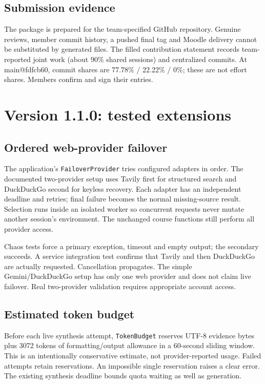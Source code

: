 \documentclass[11pt,a4paper]{article}
\begin{document}
\subsection{Submission evidence}
The package is prepared for the team-specified GitHub repository. Genuine reviews, member commit history, a pushed final tag and Moodle delivery cannot be substituted by generated files. The filled contribution statement records team-reported joint work (about 90\% shared sessions) and centralized commits. At main@fdfcb60, commit shares are 77.78\% / 22.22\% / 0\%; these are not effort shares. Members confirm and sign their entries.


\clearpage
\section*{Version 1.1.0: tested extensions}
\subsection*{Ordered web-provider failover}
The application's \texttt{FailoverProvider} tries configured adapters in order. The documented two-provider setup uses Tavily first for structured search and DuckDuckGo second for keyless recovery. Each adapter has an independent deadline and retries; final failure becomes the normal missing-source result. Selection runs inside an isolated worker so concurrent requests never mutate another session's environment. The unchanged course functions still perform all provider access.

Chaos tests force a primary exception, timeout and empty output; the secondary succeeds. A service integration test confirms that Tavily and then DuckDuckGo are actually requested. Cancellation propagates. The simple Gemini/DuckDuckGo setup has only one web provider and does not claim live failover. Real two-provider validation requires appropriate account access.

\subsection*{Estimated token budget}
Before each live synthesis attempt, \texttt{TokenBudget} reserves UTF-8 evidence bytes plus 3072 tokens of formatting/output allowance in a 60-second sliding window. This is an intentionally conservative estimate, not provider-reported usage. Failed attempts retain reservations. An impossible single reservation raises a clear error. The existing synthesis deadline bounds quota waiting as well as generation.
\end{document}
